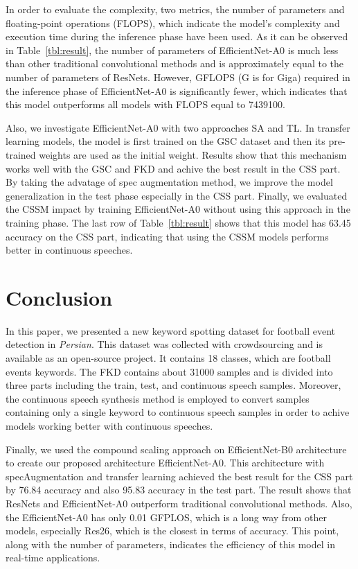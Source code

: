\documentclass{article}
\begin{document}
In order to evaluate the complexity, two metrics, the number of parameters and floating-point operations (FLOPS), which indicate the model's complexity and execution time during the inference phase have been used\cite{flops}\cite{param}. As it can be observed in Table~\ref{tbl:result}, the number of parameters of EfficientNet-A0 is much less than other traditional convolutional methods and is approximately equal to the number of parameters of ResNets. However, GFLOPS (G is for Giga) required in the inference phase of EfficientNet-A0 is significantly fewer, which indicates that this model outperforms all models with FLOPS equal to 7439100.

Also, we investigate EfficientNet-A0 with two approaches SA and TL. In transfer learning models, the model is first trained on the GSC dataset and then its pre-trained weights are used as the initial weight. Results show that this mechanism works well with the GSC and FKD and achive the best result in the CSS part. By taking the advatage of spec augmentation method, we improve the model generalization in the test phase especially in the CSS part. Finally, we evaluated the CSSM impact by training EfficientNet-A0 without using this approach in the training phase. The last row of Table~\ref{tbl:result} shows that this model has 63.45 accuracy on the CSS part, indicating that using the CSSM models performs better in continuous speeches.

\section{Conclusion}
In this paper, we presented a new keyword spotting dataset for football event detection in \textit{Persian}. This dataset was collected with crowdsourcing and is available as an open-source project. It contains 18 classes, which are football events keywords. The FKD contains about 31000 samples and is divided into three parts including the train, test, and continuous speech samples. Moreover, the continuous speech synthesis method is employed to convert samples containing only a single keyword to continuous speech samples in order to achive models working better with continuous speeches.

Finally, we used the compound scaling approach on EfficientNet-B0 architecture to create our proposed architecture EfficientNet-A0. This architecture with specAugmentation and transfer learning achieved the best result for the CSS part by 76.84 accuracy and also 95.83 accuracy in the test part. The result shows that ResNets and EfficientNet-A0 outperform traditional convolutional methods. Also, the EfficientNet-A0 has only 0.01 GFPLOS, which is a long way from other models, especially Res26, which is the closest in terms of accuracy. This point, along with the number of parameters, indicates the efficiency of this model in real-time applications.

  
  
\end{document}
